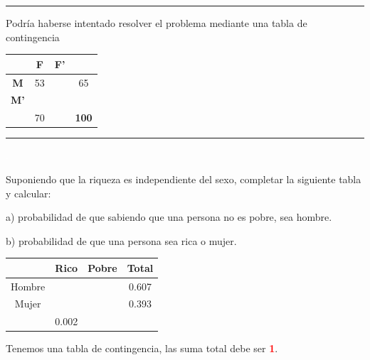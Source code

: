 \textcolor{gris}{\rule{100mm}{0.1mm}}
\begin{multicols}{2}
\textcolor{gris}{Podría haberse intentado resolver el problema mediante una tabla de contingencia}

\begin{table}[H]
\centering
\begin{tabular}{c|c|c|c}
 & \textbf{F} & \textbf{F'} & \textbf{} \\ \hline
\multicolumn{1}{c|}{\textbf{M}} & 53 &  & 65 \\ \hline
\multicolumn{1}{c|}{\textbf{M'}} &  &  &  \\ \hline
\multicolumn{1}{c|}{\textbf{}} & 70 &  & \textbf{100}
\end{tabular}
\end{table}
\end{multicols}
\begin{flushright}
\vspace{-10mm}\textcolor{gris}{\rule{100mm}{0.1mm}}	
\end{flushright}

\vspace{5mm}
\begin{ejemplo}
\begin{ejer}\textcolor{white}{.}

\begin{multicols}{2}
Suponiendo que la riqueza es independiente del sexo, completar la siguiente tabla y calcular:

a)	probabilidad de que sabiendo que una persona no es pobre, sea hombre.

b) probabilidad de que una persona sea rica o mujer.

\begin{table}[H]
\centering
\begin{tabular}{c|c|c|c|}
\cline{2-4}
 & Rico & Pobre & Total \\ \hline
\multicolumn{1}{|c|}{Hombre} &  &  & 0.607 \\ \hline
\multicolumn{1}{|c|}{Mujer} &  &  & 0.393 \\ \hline
 & 0.002 &  &  \\ \cline{2-4} 
\end{tabular}
\end{table}
\end{multicols}
	
\end{ejer}
\end{ejemplo}
Tenemos una tabla de contingencia, las suma total debe ser \textcolor{red}{\textbf{1}}.

